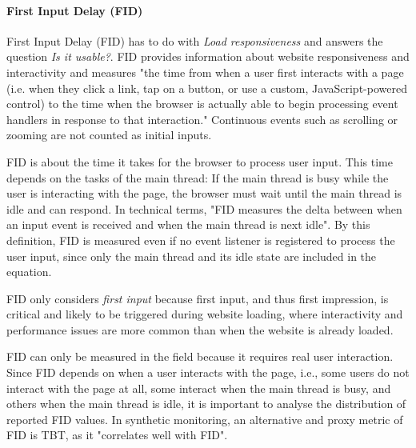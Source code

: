 

\paragraph{First Input Delay (FID)} %


First Input Delay (FID) has to do with \textit{Load responsiveness} and answers the question \textit{Is it usable?}.
FID provides information about website responsiveness and interactivity and measures "the time from when a user first interacts with a page (i.e. when they click a link, tap on a button, or use a custom, JavaScript-powered control) to the time when the browser is actually able to begin processing event handlers in response to that interaction."
Continuous events such as scrolling or zooming are not counted as initial inputs.

FID is about the time it takes for the browser to process user input.
This time depends on the tasks of the main thread:
If the main thread is busy while the user is interacting with the page, the browser must wait until the main thread is idle and can respond.
In technical terms, "FID measures the delta between when an input event is received and when the main thread is next idle".
By this definition, FID is measured even if no event listener is registered to process the user input, since only the main thread and its idle state are included in the equation.

FID only considers \textit{first input} because first input, and thus first impression, is critical and likely to be triggered during website loading, where interactivity and performance issues are more common than when the website is already loaded.


FID can only be measured in the field because it requires real user interaction.
Since FID depends on when a user interacts with the page, i.e., some users do not interact with the page at all, some interact when the main thread is busy, and others when the main thread is idle, it is important to analyse the distribution of reported FID values.
In synthetic monitoring, an alternative and proxy metric of FID is TBT, as it "correlates well with FID". %



